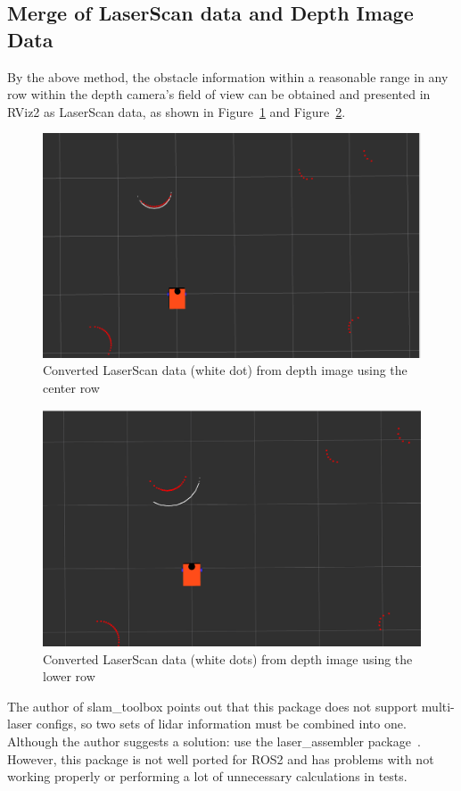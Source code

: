 \subsection{Merge of LaserScan data and Depth Image Data}
By the above method, the obstacle information 
within a reasonable range in any row within the depth camera's field of view can be obtained and presented
in RViz2 as LaserScan data, as shown in Figure~\ref{fig:centre_row} and Figure~\ref{fig:lower_row}.
\begin{figure}[H]
    \centering
    \includegraphics[width=0.8\linewidth]{figs/converted_mid.png}
    \caption{Converted LaserScan data (white dot) from depth image using the center row}
    \label{fig:centre_row}
\end{figure}
\begin{figure}[H]
    \centering
    \includegraphics[width=0.8\linewidth]{figs/converted_low.png}
    \caption{Converted LaserScan data (white dots) from depth image using the lower row}
    \label{fig:lower_row}
\end{figure}
The author of slam\_toolbox points out that this package does not support multi-laser configs, 
so two sets of lidar information must be combined into one. 
Although the author suggests a solution: use the laser\_assembler package~\cite{github}.
However, this package is not well ported for ROS2
and has problems with not working properly or performing a lot of unnecessary calculations in tests. 

